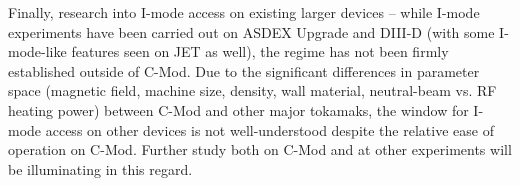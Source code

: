 \documentclass[ twoside,openright,titlepage,numbers=noenddot,headinclude,%
                footinclude=true,cleardoublepage=empty,abstractoff, %
                BCOR=5mm,paper=letter,fontsize=11pt,%
                ngerman,american,%
                ]{scrreprt}
\begin{document}
Finally, research into I-mode access on existing larger devices -- while I-mode experiments have been carried out on ASDEX Upgrade and DIII-D (with some I-mode-like features seen on JET as well), the regime has not been firmly established outside of C-Mod.  Due to the significant differences in parameter space (magnetic field, machine size, density, wall material, neutral-beam vs. RF heating power) between C-Mod and other major tokamaks, the window for I-mode access on other devices is not well-understood despite the relative ease of operation on C-Mod.  Further study both on C-Mod and at other experiments will be illuminating in this regard.


\newpage


\end{document}
